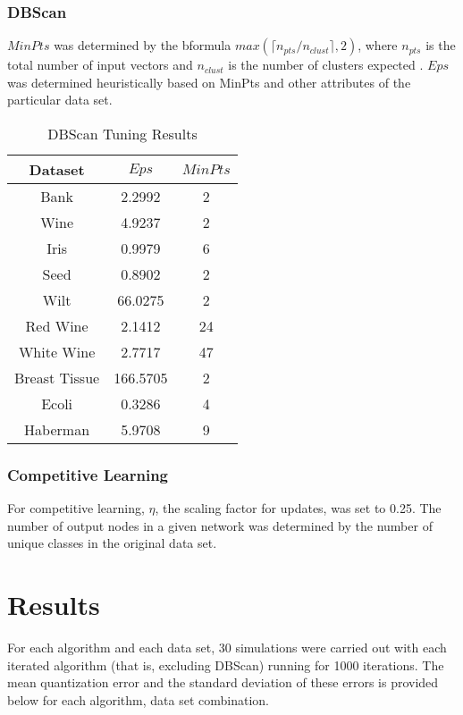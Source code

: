 \documentclass[conference]{IEEEtran}
\begin{document}
  \subsubsection{DBScan}
  $MinPts$ was determined by the bformula $max(\lceil n_{pts}/n_{clust} \rceil ,2)$, where $n_{pts}$ is the total number of input vectors and $n_{clust}$ is the number of clusters expected \cite{ankerst}. $Eps$ was determined heuristically based on MinPts and other attributes of the particular data set.
  
  \begin{table}[h]
  \caption{DBScan Tuning Results}
  \resizebox{1.3\textwidth}{!} {\begin{minipage}{\textwidth}

      \begin{tabular}{ c |c | c }
        Dataset & $Eps$ & $MinPts$ \\ \hline
        Bank & 2.2992 & 2 \\
        Wine & 4.9237 & 2 \\
        Iris & 0.9979 & 6 \\
        Seed & 0.8902 & 2 \\
        Wilt & 66.0275 & 2 \\
        Red Wine & 2.1412 & 24 \\
        White Wine & 2.7717 & 47 \\
        Breast Tissue & 166.5705 & 2 \\
        Ecoli & 0.3286 & 4 \\
        Haberman & 5.9708 & 9
      \end{tabular}

      \label{table:dbTuning}
  \end{minipage} }
  \end{table}

  \subsubsection{Competitive Learning}
For competitive learning, $\eta$, the scaling factor for updates, was set to 0.25.  The number of output nodes in a given network was determined by the number of unique classes in the original data set.
  
\section{Results}
For each algorithm and each data set, 30 simulations were carried out with each iterated algorithm (that is, excluding DBScan) running for 1000 iterations. The mean quantization error and the standard deviation of these errors is provided below for each algorithm, data set combination.
\end{document}
